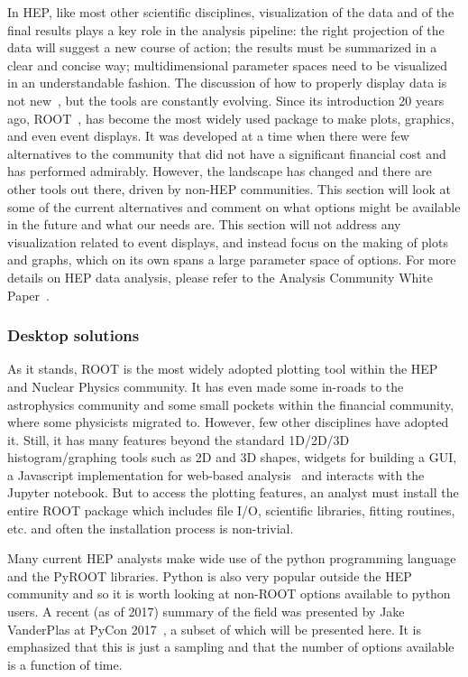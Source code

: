 \documentclass[12pt,a4paper]{article}
\begin{document}
In HEP, like most other scientific disciplines, visualization of the data and of the final results plays a key role in the
analysis pipeline: the right projection of the data will suggest a new course of action; the results must be summarized in a
clear and concise way; multidimensional parameter spaces need to be visualized in an understandable fashion. The discussion
of how to properly display data is not new~\cite{Tufte1986}, but the tools are constantly evolving. Since its introduction 20 years ago,
ROOT~\cite{Root1997}, has become the most widely used package to make plots, graphics, and even event displays. It was developed at a
time when there were few alternatives to the community that did not have a significant financial cost and has performed admirably.
However, the landscape has changed and there are other tools out there, driven by non-HEP communities. This section will look at
some of the current alternatives and comment on what options might be available in the future and what our needs are. This section
will not address any visualization related to event displays, and instead focus on the making of plots and graphs, which on its own
spans a large parameter space of options. For more details on HEP data analysis, please refer to the Analysis Community White Paper~\cite{hsf-cwp-analysis}.

\hypertarget{stats-desktop}{%
\subsubsection{Desktop solutions}\label{stats-desktop}}

As it stands, ROOT is the most widely adopted plotting tool within the HEP and Nuclear Physics community.
It has even made some in-roads to the astrophysics community and some small pockets within the financial community,
where some physicists migrated to. However, few other disciplines have adopted it. Still, it has many features beyond
the standard 1D/2D/3D histogram/graphing tools such as 2D and 3D shapes, widgets for building a GUI, a Javascript
implementation for web-based analysis~\cite{rootjs} and interacts with the Jupyter notebook. But to
access the plotting features, an analyst must install the entire ROOT package which includes file I/O, scientific
libraries, fitting routines, etc. and often the installation process is non-trivial.

Many current HEP analysts make wide use of the python programming language and the PyROOT libraries.
Python is also very popular outside the HEP community and so it is worth looking at non-ROOT options available to python users.
A recent (as of 2017) summary of the field was presented by Jake VanderPlas at PyCon 2017~\cite{VanderPlas2017}, a subset
of which will be presented here. It is emphasized that this is just a sampling and that the number of options available
is a function of time.
\end{document}
